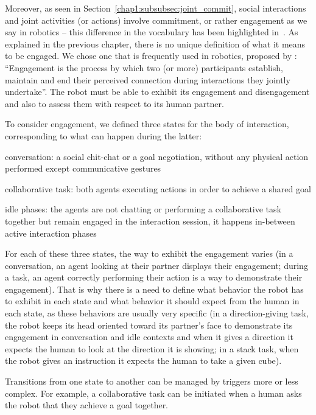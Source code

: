 \documentclass[a4paper,11pt,twoside]{StyleThese}
\begin{document}
Moreover, as seen in Section~\ref{chap1:subsubsec:joint_commit}, social interactions and joint activities (or actions) involve commitment, or rather engagement as we say in robotics -- this difference in the vocabulary has been highlighted in~\citep{castro_2019_commitments}. As explained in the previous chapter, there is no unique definition of what it means to be engaged. We chose one that is frequently used in robotics, proposed by \cite{sidner_2003_engagement}: ``Engagement is the process by which two (or more) participants establish, maintain and end their perceived connection during interactions they jointly undertake''. The robot must be able to exhibit its engagement and disengagement and also to assess them with respect to its human partner.

To consider engagement, we defined three states for the body of interaction, corresponding to what can happen during the latter: 
\begin{bulletList}
	\item conversation: a social chit-chat or a goal negotiation, without any physical action performed except communicative gestures
	\item collaborative task: both agents executing actions in order to achieve a shared goal
	\item idle phases: the agents are not chatting or performing a collaborative task together but remain engaged in the interaction session, it happens in-between active interaction phases
\end{bulletList}

For each of these three states, the way to exhibit the engagement varies (\eg in a conversation, an agent looking at their partner displays their engagement; during a task, an agent correctly performing their action is a way to demonstrate their engagement). That is why there is a need to define what behavior the robot has to exhibit in each state and what behavior it should expect from the human in each state, as these behaviors are usually very specific (\eg in a direction-giving task, the robot keeps its head oriented toward its partner's face to demonstrate its engagement in conversation and idle contexts and when it gives a direction it expects the human to look at the direction it is showing; in a stack task, when the robot gives an instruction it expects the human to take a given cube).

Transitions from one state to another can be managed by triggers more or less complex. For example, a collaborative task can be initiated when a human asks the robot that they achieve a goal together.
\end{document}
